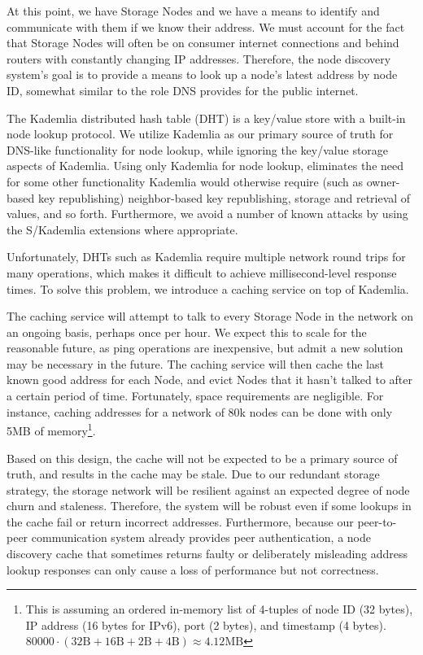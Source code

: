 \documentclass[8pt,fleqn,openany]{book}
\begin{document}
At this point, we have Storage Nodes and we have a means to identify and
communicate with
them if we know their address. We must account for the fact that Storage Nodes
will often be on consumer internet connections and behind routers with
constantly changing IP
addresses. Therefore, the node discovery system's goal is to provide a means to look
up a node's latest address by node ID, somewhat similar to the role DNS
provides for the public internet.

The Kademlia distributed hash table (DHT) is a key/value store with a built-in node lookup protocol.
We utilize Kademlia as our primary source of truth for DNS-like
functionality for node lookup, while ignoring the key/value storage aspects of
Kademlia.
Using only Kademlia for node lookup, eliminates the need for some other
functionality Kademlia would otherwise require (such as owner-based key
republishing) neighbor-based key republishing, storage and retrieval of values,
and so forth. Furthermore, we avoid a number of known attacks by using the
S/Kademlia \cite{skad} extensions where appropriate.

Unfortunately, DHTs such as Kademlia require multiple network round trips for
many operations, which makes it difficult to achieve millisecond-level
response times. To solve this problem, we introduce a caching service on top
of Kademlia.

The caching service will attempt to talk to every Storage Node in the network
on an ongoing basis, perhaps once per hour. We expect this to scale for the
reasonable future, as ping operations are inexpensive, but admit a new solution
may be necessary in the future.
The caching service will then cache
the last known good address for each Node, and evict Nodes that it hasn't talked
to after a certain period of time.
Fortunately, space requirements are negligible. For instance, caching addresses
for a network of 80k nodes
can be done with only 5MB of memory\footnote{
This is assuming an ordered in-memory list of 4-tuples of node ID (32 bytes),
IP address (16 bytes for IPv6), port (2 bytes), and timestamp (4 bytes).
$80000\cdot(32 \mbox{B}+16 \mbox{B}+2 \mbox{B}+4 \mbox{B}) \approx 4.12 \mbox{MB}$
}.

Based on this design, the cache will not be expected to be a primary source
of truth, and results in the cache may be stale. Due to our redundant
storage strategy, the storage network will be resilient against an expected
degree of node churn and staleness.
Therefore, the system will be robust even if some lookups in the cache
fail or return incorrect addresses.
Furthermore, because our peer-to-peer communication
system already provides peer authentication, a node discovery cache that
sometimes returns faulty
or deliberately misleading address lookup responses can only cause a
loss of performance but not correctness.
\end{document}
